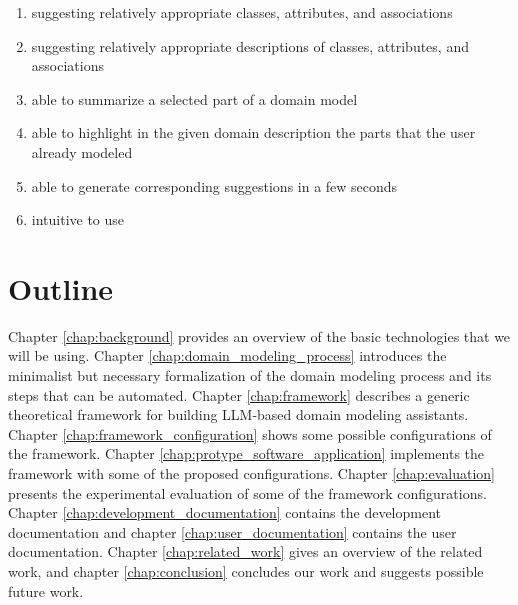 \begin{enumerate}
\item suggesting relatively appropriate classes, attributes, and associations
\item suggesting relatively appropriate descriptions of classes, attributes, and associations
\item able to summarize a selected part of a domain model
\item able to highlight in the given domain description the parts that the user already modeled
\item able to generate corresponding suggestions in a few seconds
\item intuitive to use
\end{enumerate}


\section*{Outline}

Chapter \ref{chap:background} provides an overview of the basic technologies that we will be using.
Chapter \ref{chap:domain_modeling_process} introduces the minimalist but necessary formalization of the domain modeling process and its steps that can be automated.
Chapter \ref{chap:framework} describes a generic theoretical framework for building LLM-based domain modeling assistants.
Chapter \ref{chap:framework_configuration} shows some possible configurations of the framework.
Chapter \ref{chap:protype_software_application} implements the framework with some of the proposed configurations.
Chapter \ref{chap:evaluation} presents the experimental evaluation of some of the framework configurations.
Chapter \ref{chap:development_documentation} contains the development documentation and chapter \ref{chap:user_documentation} contains the user documentation. Chapter \ref{chap:related_work} gives an overview of the related work, and chapter \ref{chap:conclusion} concludes our work and suggests possible future work.